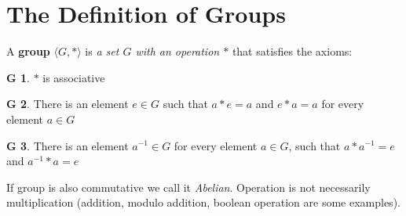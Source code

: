 \documentclass[a4paper,12pt]{article}
\theoremstyle{definition}
\theoremstyle{axiom}
\newtheorem{axiom}{G}[]
\theoremstyle{theorem}
\theoremstyle{lemma}
\begin{document}
\section{The Definition of Groups}
A \textbf{group} $\langle G, * \rangle$ is \textit{a set $G$ with an operation $*$} that satisfies the axioms:
\begin{axiom}
$*$ is associative
\end{axiom}
\begin{axiom}
There is an element $e \in G$ such that $a * e = a$ and $e * a = a$ for every element $a \in G$ 
\end{axiom}
\begin{axiom}
There is an element $a^{-1} \in G$ for every element $a \in G$, such that $a * a^{-1} = e$ and $a^{-1} * a = e$ 
\end{axiom}
If group is also commutative we call it \textit{Abelian}. Operation is not necessarily multiplication (addition, modulo addition, boolean operation are some examples).
\end{document}
